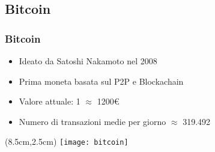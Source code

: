 \subsection{Bitcoin}
\begin{frame}
 \frametitle{Bitcoin}

 \begin{itemize}
  \item<1-> Ideato da Satoshi Nakamoto nel 2008
  \item<2-> Prima moneta basata sul P2P e Blockachain%
  \item<3-> Valore attuale: 1\bitcoin{} $ \approx $  1200\euro{}
  \item<4-> Numero di transazioni medie per giorno $ \approx $ 319.492
 \end{itemize}



 \begin{textblock*}{5cm}(8.5cm,2.5cm)
  \texttt{[image: bitcoin]}
 \end{textblock*}

\end{frame}
